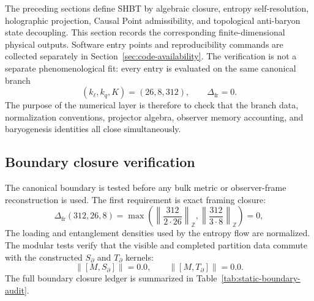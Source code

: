 \documentclass[11pt,letterpaper]{article}
\theoremstyle{plain}
\newcommand{\kell}{k_{\ell}}
\newcommand{\kq}{k_q}
\newcommand{\Kpar}{K}
\newcommand{\Deltafr}{\Delta_{\text{fr}}}
\begin{document}
The preceding sections define SHBT by algebraic closure, entropy
self-resolution, holographic projection, Causal Point admissibility, and
topological anti-baryon state decoupling.  This section records the corresponding
finite-dimensional physical outputs.  Software entry points and reproducibility
commands are collected separately in Section~\ref{sec:code-availability}.
The verification is not a separate phenomenological fit: every entry is
evaluated on the same canonical branch
 \begin{equation}
\label{eq:section-eight-benchmark-branch}
 \boxed{
 (\kell,\kq,\Kpar)=(26,8,312),
 \qquad
 \Deltafr=0.
 }
\end{equation}
The purpose of the numerical layer is therefore to check that the branch data,
normalization conventions, projector algebra, observer memory accounting, and
baryogenesis identities all close simultaneously.

\subsection{Boundary closure verification}

The canonical boundary is tested before any bulk metric or observer-frame
reconstruction is used.  The first requirement is exact framing closure:
\begin{equation}
 \Deltafr(312,26,8)
 =
 \max\!\left(
 \left\|\frac{312}{2\cdot26}\right\|_{\mathbb Z},
 \left\|\frac{312}{3\cdot8}\right\|_{\mathbb Z}
 \right)
 =0,
\end{equation}
The loading and entanglement densities used by the entropy
flow are normalized.  The modular tests verify that the visible and completed
partition data commute with the constructed $S_{\partial}$ and $T_{\partial}$
kernels:
\begin{equation}
\label{eq:section-eight-modular-commutators}
 \|[M,S_{\partial}]\|=0.0,
 \qquad
 \|[M,T_{\partial}]\|=0.0.
\end{equation}
The full boundary closure ledger is summarized in
Table~\ref{tab:static-boundary-audit}.
\end{document}
